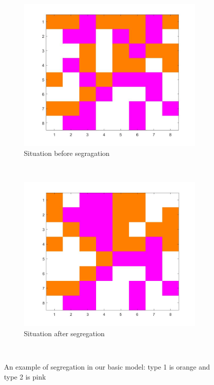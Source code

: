 \begin{figure}[H]
	\centering
    \begin{subfigure}{0.45\textwidth}
        \includegraphics[width=\textwidth]{vb1beginbord.jpg}
        \caption{Situation before segragation}
        \label{fig:movement1}
    \end{subfigure}\hspace{0cm}
    ~ %
    \begin{subfigure}{0.45\textwidth}
        \includegraphics[width=\textwidth]{vb1eindbord.jpg}
        \caption{Situation after segregation}
        \label{fig:movement2}
    \end{subfigure}
    ~ %
    \caption{An example of segregation in our basic model: type 1 is orange and type 2 is pink}
    \label{fig:equilibrium counterexample}
\end{figure}


